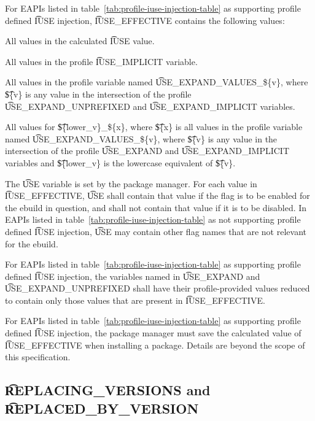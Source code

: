  For EAPIs listed in table~\ref{tab:profile-iuse-injection-table}
as supporting profile defined \t{IUSE} injection, \t{IUSE\_EFFECTIVE} contains the following values:

\begin{compactitem}
\item All values in the calculated \t{IUSE} value.
\item All values in the profile \t{IUSE\_IMPLICIT} variable.
\item All values in the profile variable named \t{USE\_EXPAND\_VALUES\_\$\{v\}}, where \t{\$\{v\}}
    is any value in the intersection of the profile \t{USE\_EXPAND\_UNPREFIXED} and
    \t{USE\_EXPAND\_IMPLICIT} variables.
\item All values for \t{\$\{lower\_v\}\_\$\{x\}}, where \t{\$\{x\}} is all values in the profile
    variable named \t{USE\_EXPAND\_VALUES\_\$\{v\}}, where \t{\$\{v\}} is any value in the
    intersection of the profile \t{USE\_EXPAND} and \t{USE\_EXPAND\_IMPLICIT} variables and
    \t{\$\{lower\_v\}} is the lowercase equivalent of \t{\$\{v\}}.
\end{compactitem}

The \t{USE} variable is set by the package manager. For each value in \t{IUSE\_EFFECTIVE}, \t{USE}
shall contain that value if the flag is to be enabled for the ebuild in question, and shall not
contain that value if it is to be disabled. In EAPIs listed in
table~\ref{tab:profile-iuse-injection-table} as not supporting profile defined \t{IUSE} injection,
\t{USE} may contain other flag names that are not relevant for the ebuild.

For EAPIs listed in table~\ref{tab:profile-iuse-injection-table} as supporting profile defined
\t{IUSE} injection, the variables named in \t{USE\_EXPAND} and \t{USE\_EXPAND\_UNPREFIXED} shall
have their profile-provided values reduced to contain only those values that are present in
\t{IUSE\_EFFECTIVE}.

For EAPIs listed in table~\ref{tab:profile-iuse-injection-table} as supporting profile defined
\t{IUSE} injection, the package manager must save the calculated value of \t{IUSE\_EFFECTIVE} when
installing a package. Details are beyond the scope of this specification.

\subsection{\t{REPLACING\_VERSIONS} and \t{REPLACED\_BY\_VERSION}}
\label{sec:replacing-versions}

